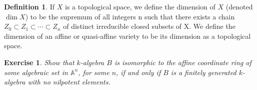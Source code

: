 \documentclass[11pt]{book}
\newtheorem{exercise}{Exercise}[section]
\theoremstyle{definition}
\newtheorem{definition}[theorem]{Definition}
\numberwithin{equation}{section}
\begin{document}
\begin{defbox}
    \begin{definition}
        \label{def:dimension_topological_space}
        If \(X\) is a topological space, we define the dimension of \(X\) (denoted
        \(\dim  X\)) to be the supremum of all integers n such that there exists a chain \(Z_0 \subset Z_1 \subset \cdots \subset Z_n\) of distinct irreducible closed subsets of X. We define the dimension of an affine or quasi-affine variety to be its dimension as a topological space. 
    \end{definition}
\end{defbox}

% 

\begin{exercise}
Show that \(k\)-algebra \(B\) is isomorphic to the affine coordinate ring of some algebraic set in \(\mathbb{A}^n\), for some \(n\), if and only if \(B\) is a finitely generated \(k\)-algebra with no nilpotent elements.
\end{exercise}

\printbibliography
\end{document}
